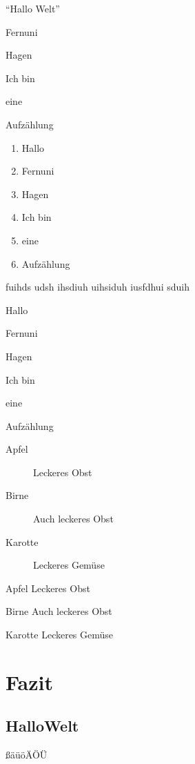 \documentclass[12pt,ngerman,parskip=full]{scrreprt}
\begin{document}
\begin{compactitem}[$\Rightarrow$]
	\item \enquote{Hallo Welt}
	\item Fernuni
	\item Hagen
	\item Ich bin
	\item eine 
	\item Aufzählung
\end{compactitem}

\begin{enumerate}[I]
	\item Hallo 
	\item Fernuni
	\item Hagen
	\item Ich bin
	\item eine 
	\item Aufzählung
\end{enumerate}

fuihds udsh ihsdiuh uihsiduh iusfdhui sduih 

\begin{compactenum}[A)] \setcounter{enumi}{6}
	\item Hallo 
	\item Fernuni
	\item Hagen
	\item Ich bin
	\item eine 
	\item Aufzählung
\end{compactenum}

\begin{description}
\item[Apfel] Leckeres Obst
\item[Birne] Auch leckeres Obst
\item[Karotte] Leckeres Gemüse
\end{description}

\begin{compactdesc}
\item[Apfel] Leckeres Obst
\item[Birne] Auch leckeres Obst
\item[Karotte] Leckeres Gemüse
\end{compactdesc}


\chapter{Fazit}\label{cha:fazit}

\section{HalloWelt}\label{sec:hallo}

ßäüöÄÖÜ

\blindtext[2]  

\blindtext[2]  

\blindtext[2]  
\end{document}

